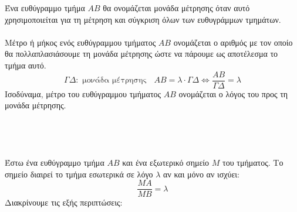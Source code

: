 \documentclass[twoside,nofonts,internet,shmeiwseis]{thewria}
\begin{document}
\orismoi
{}
Ένα ευθύγραμμο τμήμα $ AB $ θα ονομάζεται μονάδα μέτρησης όταν αυτό χρησιμοποιείται για τη μέτρηση και σύγκριση όλων των ευθυγράμμων τμημάτων.\\\\
Μέτρο ή μήκος ενός ευθύγραμμου τμήματος $ AB $ ονομάζεται ο αριθμός με τον οποίο θα πολλαπλασιάσουμε τη μονάδα μέτρησης ώστε να πάρουμε ως αποτέλεσμα το τμήμα αυτό.
\[ \varGamma\varDelta : \textrm{ μονάδα μέτρησης }\;\;AB=\lambda\cdot\varGamma\varDelta\Leftrightarrow\dfrac{AB}{\varGamma\varDelta}=\lambda \]
Ισοδύναμα, μέτρο του ευθύγραμμου τμήματος $ AB $ ονομάζεται ο λόγος του προς τη μονάδα μέτρησης.\\\\
\thewrhmata
{}
\mbox{}\\\\\\
Έστω ένα ευθύγραμμο τμήμα $ AB $ και ένα εξωτερικό σημείο $ M $ του τμήματος. Το σημείο διαιρεί το τμήμα εσωτερικά σε λόγο $ \lambda $ αν και μόνο αν ισχύει:
\[ \frac{MA}{MB}=\lambda \]
Διακρίνουμε τις εξής περιπτώσεις:
\end{document}
